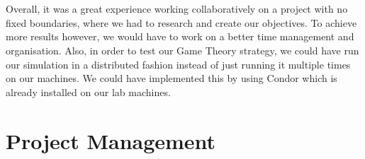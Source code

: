 \documentclass[10pt, a4paper]{report}
\begin{document}
\\\\
Overall, it was a great experience working collaboratively on a project with no fixed boundaries, where we had to research and create our objectives. To achieve more  results however, we would have to work on a better time management and organisation. Also, in order to test our Game Theory strategy, we could have run our simulation in a distributed fashion instead of just running it multiple times on our machines. We could have implemented this by using Condor which is already installed on our lab machines.


\chapter{Project Management}\label{ch:projmanag}
\end{document}
